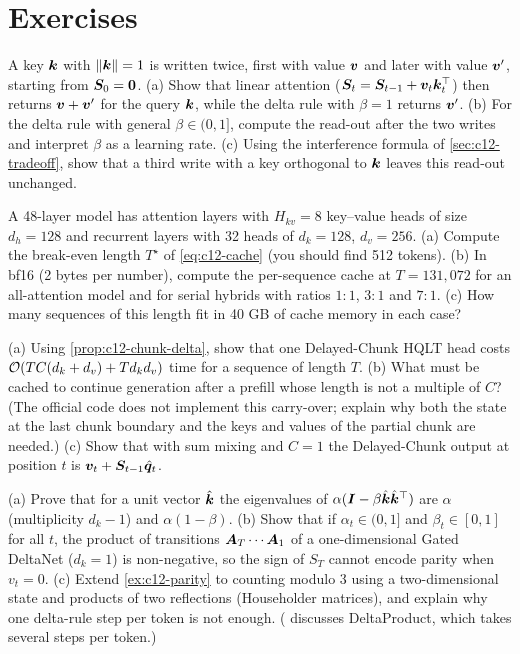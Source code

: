 \section*{Exercises}

\begin{exercise}\label{exr:c12-overwrite}
A key $\bm{k}$ with $\left\lVert \bm{k}\right\rVert=1$ is written twice, first with value $\bm{v}$ and later with value
$\bm{v}'$, starting from $\bm{S}_0 = \bm0$. (a) Show that linear attention ($\bm{S}_t = \bm{S}_{t-1} +
\bm{v}_t\bm{k}_t^{\top}$) then returns $\bm{v}+\bm{v}'$ for the query $\bm{k}$, while the delta rule with $\beta=1$
returns $\bm{v}'$. (b) For the delta rule with general $\beta\in(0,1]$, compute the read-out after
the two writes and interpret $\beta$ as a learning rate. (c) Using the interference formula of
\cref{sec:c12-tradeoff}, show that a third write with a key orthogonal to $\bm{k}$ leaves this
read-out unchanged.
\end{exercise}

\begin{exercise}\label{exr:c12-cache}
A 48-layer model has attention layers with $H_{kv}=8$ key--value heads of size $d_h = 128$ and
recurrent layers with 32 heads of $d_k = 128$, $d_v = 256$. (a) Compute the break-even length
$T^\star$ of \eqref{eq:c12-cache} (you should find 512 tokens). (b) In bf16 (2 bytes per number),
compute the per-sequence cache at $T = 131{,}072$ for an all-attention model and for serial hybrids
with ratios $1{:}1$, $3{:}1$ and $7{:}1$. (c) How many sequences of this length fit in 40 GB of
cache memory in each case?
\end{exercise}

\begin{exercise}\label{exr:c12-delayed-chunk}
(a) Using \cref{prop:c12-chunk-delta}, show that one Delayed-Chunk HQLT head costs
$\mathcal{O}(TC(d_k+d_v) + Td_kd_v)$ time for a sequence of length $T$. (b) What must be cached to
continue generation after a prefill whose length is not a multiple of $C$? (The official code does
not implement this carry-over; explain why both the state at the last chunk boundary and the keys
and values of the partial chunk are needed.) (c) Show that with sum mixing and $C=1$ the
Delayed-Chunk output at position $t$ is $\bm{v}_t + \bm{S}_{t-1}\hat{\bm{q}}_t$.
\end{exercise}

\begin{exercise}\label{exr:c12-parity}
(a) Prove that for a unit vector $\hat{\bm{k}}$ the eigenvalues of $\alpha(\bm{I} - \beta\hat{\bm{k}}\hat{\bm{k}}^{\top})$
are $\alpha$ (multiplicity $d_k-1$) and $\alpha(1-\beta)$. (b) Show that if $\alpha_t\in(0,1]$ and
$\beta_t\in[0,1]$ for all $t$, the product of transitions $\bm{A}_T\cdots\bm{A}_1$ of a one-dimensional
Gated DeltaNet ($d_k = 1$) is non-negative, so the sign of $S_T$ cannot encode parity when $v_t=0$.
(c) Extend \cref{ex:c12-parity} to counting modulo 3 using a two-dimensional state and products of
two reflections (Householder matrices), and explain why one delta-rule step per token is not enough.
( discusses DeltaProduct, which takes several steps per token.)
\end{exercise}

